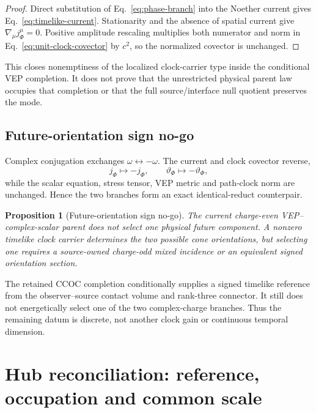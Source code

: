 \documentclass[11pt]{article}
\newtheorem{proposition}{Proposition}
\begin{document}
\begin{proof}
Direct substitution of Eq.~\eqref{eq:phase-branch} into the Noether current
gives Eq.~\eqref{eq:timelike-current}. Stationarity and the absence of spatial
current give \(\nabla_\mu j_\Phi^\mu=0\). Positive amplitude rescaling
multiplies both numerator and norm in Eq.~\eqref{eq:unit-clock-covector} by
\(c^2\), so the normalized covector is unchanged.
\end{proof}

This closes nonemptiness of the localized clock-carrier type inside the
conditional VEP completion. It does not prove that the unrestricted physical
parent law occupies that
completion or that the full source/interface null quotient preserves the mode.

\subsection{Future-orientation sign no-go}

Complex conjugation exchanges \(\omega\leftrightarrow-\omega\). The current
and clock covector reverse,
\begin{equation}
 j_\Phi\mapsto-j_\Phi,
 \qquad
 \vartheta_\Phi\mapsto-\vartheta_\Phi,
\end{equation}
while the scalar equation, stress tensor, VEP metric and path-clock norm are
unchanged. Hence the two branches form an exact identical-reduct counterpair.

\begin{proposition}[Future-orientation sign no-go]
The current charge-even VEP--complex-scalar parent does not select one physical
future component. A nonzero timelike clock carrier determines the two possible
cone orientations, but selecting one requires a source-owned charge-odd mixed
incidence or an equivalent signed orientation section.
\end{proposition}

The retained CCOC completion conditionally supplies a signed timelike reference
from the observer--source contact volume and rank-three connector. It still
does not energetically select one of the two complex-charge branches. Thus the
remaining datum is discrete, not another clock gain or continuous temporal
dimension.

\section{Hub reconciliation: reference, occupation and common scale}
\end{document}
